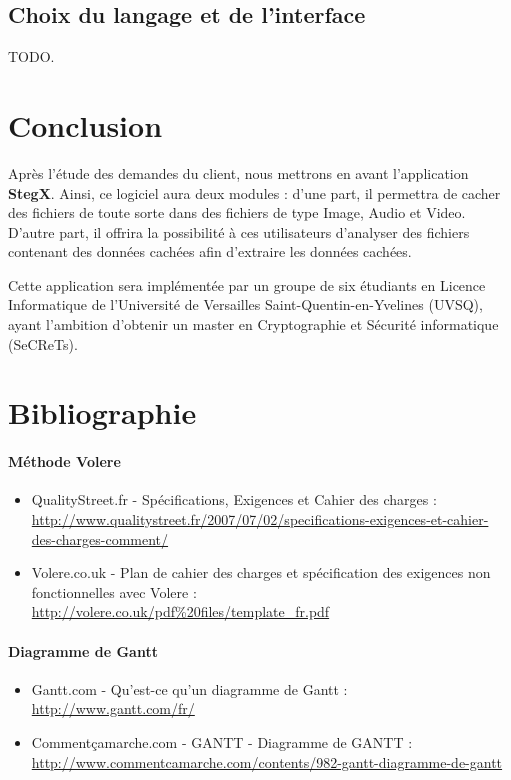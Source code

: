 \documentclass[11pt]{article}
\begin{document}
\subsection{Choix du langage et de l'interface}

TODO.

\section{Conclusion}

Après l'étude des demandes du client, nous mettrons en avant l'application
\textbf{StegX}. 
Ainsi, ce logiciel aura deux modules : d'une part, il permettra de cacher 
des fichiers de toute sorte dans des fichiers de type Image, Audio et Video. 
D'autre part, il offrira la possibilité à ces utilisateurs d'analyser des 
fichiers contenant des données cachées afin d'extraire les données cachées. 

Cette application sera implémentée par un groupe de six
étudiants en Licence Informatique de l'Université de Versailles
Saint-Quentin-en-Yvelines (UVSQ), ayant l'ambition d'obtenir un master en
Cryptographie et Sécurité informatique (SeCReTs). 

\newpage

\section{Bibliographie}

\paragraph{Méthode Volere}
\begin{itemize}
\item QualityStreet.fr - Spécifications, Exigences et Cahier des charges : \\
    \url{http://www.qualitystreet.fr/2007/07/02/specifications-exigences-et-cahier-des-charges-comment/}
\item Volere.co.uk - Plan de cahier des charges et spécification des exigences
    non fonctionnelles avec Volere : \\
    \url{http://volere.co.uk/pdf%20files/template_fr.pdf}
\end{itemize}

\paragraph{Diagramme de Gantt}
\begin{itemize}
\item Gantt.com - Qu'est-ce qu'un diagramme de Gantt : \\
    \url{http://www.gantt.com/fr/}
\item Commentçamarche.com - GANTT - Diagramme de GANTT : \\
    \url{http://www.commentcamarche.com/contents/982-gantt-diagramme-de-gantt}
\end{itemize}
\end{document}
